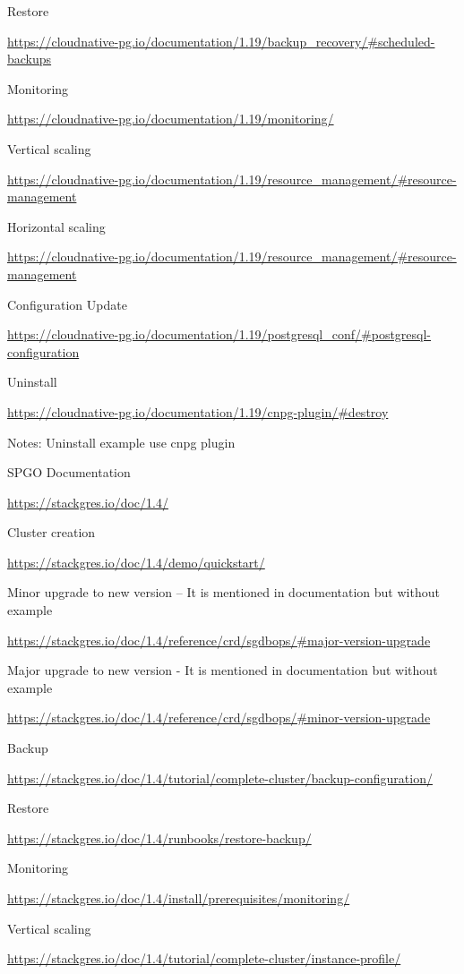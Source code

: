 Restore

\url{https://cloudnative-pg.io/documentation/1.19/backup_recovery/#scheduled-backups}

Monitoring

\url{https://cloudnative-pg.io/documentation/1.19/monitoring/}

Vertical scaling

\url{https://cloudnative-pg.io/documentation/1.19/resource_management/#resource-management}

Horizontal scaling

\url{https://cloudnative-pg.io/documentation/1.19/resource_management/#resource-management}

Configuration Update

\url{https://cloudnative-pg.io/documentation/1.19/postgresql_conf/#postgresql-configuration}

Uninstall

\url{https://cloudnative-pg.io/documentation/1.19/cnpg-plugin/#destroy}

Notes: Uninstall example use cnpg plugin

SPGO
Documentation

\url{https://stackgres.io/doc/1.4/}

Cluster creation

\url{https://stackgres.io/doc/1.4/demo/quickstart/}

Minor upgrade to new version – It is mentioned in documentation but without example

\url{https://stackgres.io/doc/1.4/reference/crd/sgdbops/#major-version-upgrade}

Major upgrade to new version - It is mentioned in documentation but without example

\url{https://stackgres.io/doc/1.4/reference/crd/sgdbops/#minor-version-upgrade}

Backup

\url{https://stackgres.io/doc/1.4/tutorial/complete-cluster/backup-configuration/}

Restore

\url{https://stackgres.io/doc/1.4/runbooks/restore-backup/}

Monitoring

\url{https://stackgres.io/doc/1.4/install/prerequisites/monitoring/}

Vertical scaling

\url{https://stackgres.io/doc/1.4/tutorial/complete-cluster/instance-profile/}

